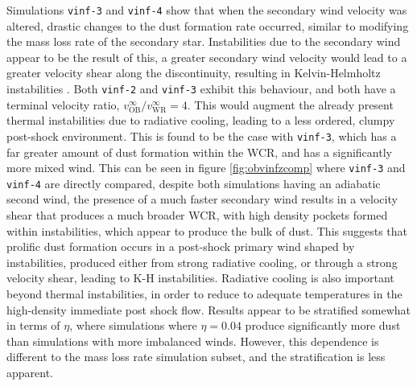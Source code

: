 Simulations \texttt{vinf-3} and \texttt{vinf-4} show that when the secondary wind velocity was altered, drastic changes to the dust formation rate occurred, similar to modifying the mass loss rate of the secondary star.
Instabilities due to the secondary wind appear to be the result of this, a greater secondary wind velocity would lead to a greater velocity shear along the discontinuity, resulting in Kelvin-Helmholtz instabilities \parencite{stevens_colliding_1992}.
Both \texttt{vinf-2} and \texttt{vinf-3} exhibit this behaviour, and both have a terminal velocity ratio, $v_\text{OB}^\infty / v_\text{WR}^\infty = 4$.
This would augment the already present thermal instabilities due to radiative cooling, leading to a less ordered, clumpy post-shock environment.
This is found to be the case with \texttt{vinf-3}, which has a far greater amount of dust formation within the WCR, and has a significantly more mixed wind.
This can be seen in figure \ref{fig:obvinfzcomp} where \texttt{vinf-3} and \texttt{vinf-4} are directly compared, despite both simulations having an adiabatic second wind, the presence of a much faster secondary wind results in a velocity shear that produces a much broader WCR, with high density pockets formed within instabilities, which appear to produce the bulk of dust. 
This suggests that prolific dust formation occurs in a post-shock primary wind shaped by instabilities, produced either from strong radiative cooling, or through a strong velocity shear, leading to K-H instabilities.
Radiative cooling is also important beyond thermal instabilities, in order to reduce to adequate temperatures in the high-density immediate post shock flow.
Results appear to be stratified somewhat in terms of $\eta$, where simulations where $\eta = 0.04$ produce significantly more dust than simulations with more imbalanced winds.
However, this dependence is different to the mass loss rate simulation subset, and the stratification is less apparent.




